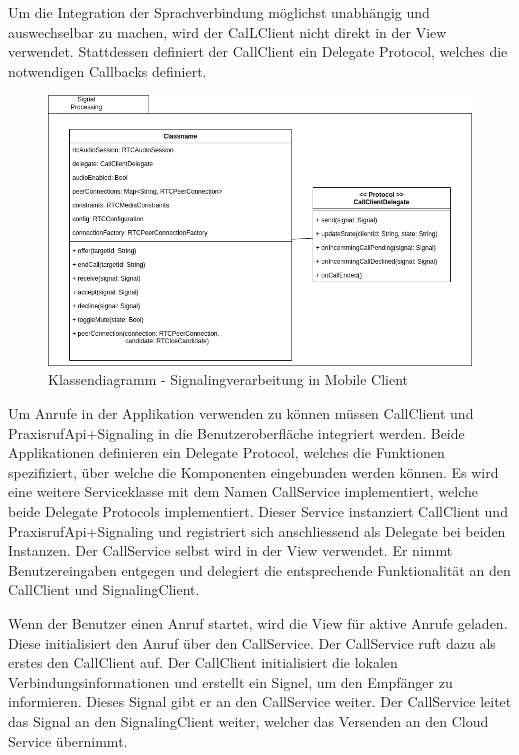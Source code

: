 Um die Integration der Sprachverbindung möglichst unabhängig und auswechselbar zu machen, wird der CalLClient nicht direkt in der View verwendet.
Stattdessen definiert der CallClient ein Delegate Protocol, welches die notwendigen Callbacks definiert.

\begin{figure}[h]
    \centering
    \begin{minipage}[b]{0.9\textwidth}
        \includegraphics[width=\textwidth]{graphics/diagramms/Class_Mobile_Client_Signal_Processing}
        \caption{Klassendiagramm - Signalingverarbeitung in Mobile Client}
    \end{minipage}
\end{figure}

Um Anrufe in der Applikation verwenden zu können müssen CallClient und PraxisrufApi+Signaling in die Benutzeroberfläche integriert werden.
Beide Applikationen definieren ein Delegate Protocol, welches die Funktionen spezifiziert, über welche die Komponenten eingebunden werden können.
Es wird eine weitere Serviceklasse mit dem Namen CallService implementiert, welche beide Delegate Protocols implementiert.
Dieser Service instanziert CallClient und PraxisrufApi+Signaling und registriert sich anschliessend als Delegate bei beiden Instanzen.
Der CallService selbst wird in der View verwendet.
Er nimmt Benutzereingaben entgegen und delegiert die entsprechende Funktionalität an den CallClient und SignalingClient.

Wenn der Benutzer einen Anruf startet, wird die View für aktive Anrufe geladen.
Diese initialisiert den Anruf über den CallService.
Der CallService ruft dazu als erstes den CallClient auf.
Der CallClient initialisiert die lokalen Verbindungsinformationen und erstellt ein Signel, um den Empfänger zu informieren.
Dieses Signal gibt er an den CallService weiter.
Der CallService leitet das Signal an den SignalingClient weiter, welcher das Versenden an den Cloud Service übernimmt.

